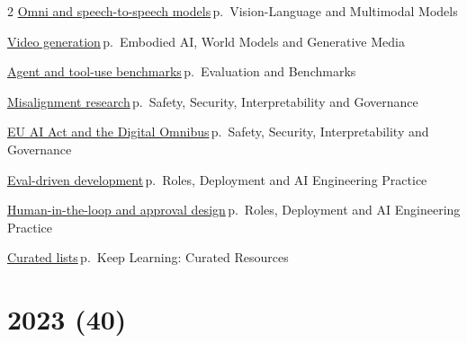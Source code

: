 \documentclass[10pt,a4paper,openany]{report}
\begin{document}
\begin{multicols}{2}
\hyperref[c:vlm-7]{Omni and speech-to-speech models}\,{\color{muted}\scriptsize p.\,\pageref{c:vlm-7}} {\color{muted}\scriptsize Vision-Language and Multimodal Models}\par\vspace{2pt}
\hyperref[c:embodied-6]{Video generation}\,{\color{muted}\scriptsize p.\,\pageref{c:embodied-6}} {\color{muted}\scriptsize Embodied AI, World Models and Generative Media}\par\vspace{2pt}
\hyperref[c:evals-5]{Agent and tool-use benchmarks}\,{\color{muted}\scriptsize p.\,\pageref{c:evals-5}} {\color{muted}\scriptsize Evaluation and Benchmarks}\par\vspace{2pt}
\hyperref[c:safety-9]{Misalignment research}\,{\color{muted}\scriptsize p.\,\pageref{c:safety-9}} {\color{muted}\scriptsize Safety, Security, Interpretability and Governance}\par\vspace{2pt}
\hyperref[c:safety-11]{EU AI Act and the Digital Omnibus}\,{\color{muted}\scriptsize p.\,\pageref{c:safety-11}} {\color{muted}\scriptsize Safety, Security, Interpretability and Governance}\par\vspace{2pt}
\hyperref[c:practice-4]{Eval-driven development}\,{\color{muted}\scriptsize p.\,\pageref{c:practice-4}} {\color{muted}\scriptsize Roles, Deployment and AI Engineering Practice}\par\vspace{2pt}
\hyperref[c:practice-6]{Human-in-the-loop and approval design}\,{\color{muted}\scriptsize p.\,\pageref{c:practice-6}} {\color{muted}\scriptsize Roles, Deployment and AI Engineering Practice}\par\vspace{2pt}
\hyperref[c:learn-3]{Curated lists}\,{\color{muted}\scriptsize p.\,\pageref{c:learn-3}} {\color{muted}\scriptsize Keep Learning: Curated Resources}\par\vspace{2pt}
\end{multicols}
\section{2023 (40)}
\end{document}
